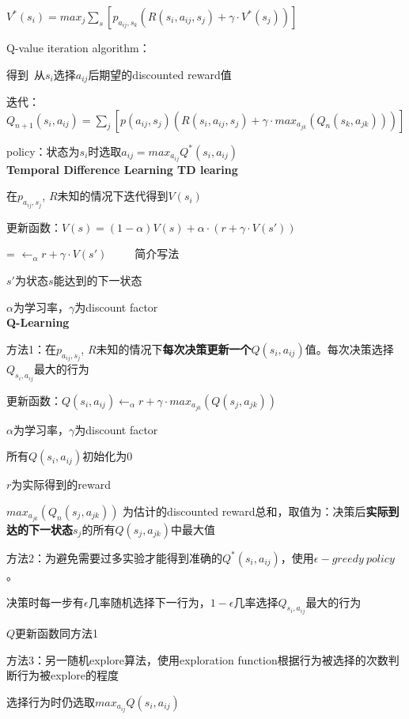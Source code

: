 \documentclass[UTF8]{ctexart}
\begin{document}
  \quad $V^*(s_i) = max_j \sum_s [p_{a_{ij}, s_k} (R(s_i, a_{ij}, s_j) + \gamma \cdot V^*(s_j))]$
  
  Q-value iteration algorithm：

  \quad 得到\ 从$s_i$选择$a_{ij}$后期望的discounted reward值

  \quad 迭代：$Q_{n+1}(s_i, a_{ij}) = \sum_j [p(a_{ij}, s_j) (R(s_i, a_{ij}, s_j) + \gamma \cdot max_{a_{jk}} (Q_n(s_k, a_{jk})))]$
  
  policy：状态为$s_i$时选取$a_{ij} = max_{a_{ij}} Q^*(s_i, a_{ij})$\\
\textbf{Temporal Difference Learning TD learing}

  在$p_{a_{ij}, s_j}$, $R$未知的情况下迭代得到$V(s_i)$
  
  更新函数：$V(s) = (1-\alpha)V(s) + \alpha \cdot (r + \gamma \cdot V(s'))$
  
  \quad = $\leftarrow_{\alpha} r + \gamma \cdot V(s') $\ \ \ \ \ 简介写法
  
  \quad $s'$为状态$s$能达到的下一状态
  
  \quad $\alpha$为学习率，$\gamma$为discount factor\\
\textbf{Q-Learning}

  方法1：在$p_{a_{ij}, s_j}$, $R$未知的情况下\textbf{每次决策更新一个}$Q(s_i, a_{ij})$值。每次决策选择$Q_{s_i, a_{ij}}$最大的行为

  \quad 更新函数：$Q(s_i, a_{ij}) \leftarrow_{\alpha} r + \gamma \cdot max_{a_{jk}} (Q(s_j, a_{jk}))$

  \quad \quad $\alpha$为学习率，$\gamma$为discount factor

  \quad \quad 所有$Q(s_i, a_{ij})$初始化为0
  
  \quad \quad $r$为实际得到的reward

  \quad \quad $max_{a_{jk}} (Q_{n}(s_j, a_{jk}))$ 为估计的discounted reward总和，取值为：决策后\textbf{实际到达的下一状态}$s_j$的所有$Q(s_j, a_{jk})$中最大值

  方法2：为避免需要过多实验才能得到准确的$Q^*(s_i, a_{ij})$，使用$\epsilon-greedy\ policy$。
  
  \quad 决策时每一步有$\epsilon$几率随机选择下一行为，$1-\epsilon$几率选择$Q_{s_i, a_{ij}}$最大的行为

  \quad $Q$更新函数同方法1
  
  方法3：另一随机explore算法，使用exploration function根据行为被选择的次数判断行为被explore的程度
  
  \quad 选择行为时仍选取$max_{a_{ij}} Q(s_i, a_{ij})$
  
\end{document}
